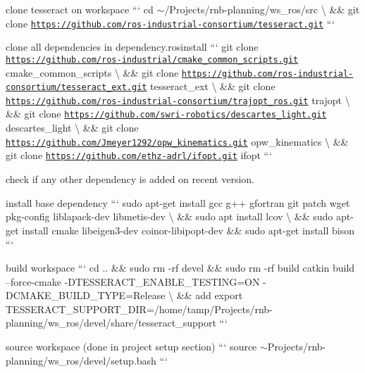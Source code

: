 \begin{DoxyItemize}
\item clone tesseract on workspace ``` cd $\sim$/\+Projects/rnb-\/planning/ws\+\_\+ros/src \textbackslash{} \&\& git clone \href{https://github.com/ros-industrial-consortium/tesseract.git}{\tt https\+://github.\+com/ros-\/industrial-\/consortium/tesseract.\+git} ```
\item clone all dependencies in dependency.\+rosinstall ``` git clone \href{https://github.com/ros-industrial/cmake_common_scripts.git}{\tt https\+://github.\+com/ros-\/industrial/cmake\+\_\+common\+\_\+scripts.\+git} cmake\+\_\+common\+\_\+scripts \textbackslash{} \&\& git clone \href{https://github.com/ros-industrial-consortium/tesseract_ext.git}{\tt https\+://github.\+com/ros-\/industrial-\/consortium/tesseract\+\_\+ext.\+git} tesseract\+\_\+ext \textbackslash{} \&\& git clone \href{https://github.com/ros-industrial-consortium/trajopt_ros.git}{\tt https\+://github.\+com/ros-\/industrial-\/consortium/trajopt\+\_\+ros.\+git} trajopt \textbackslash{} \&\& git clone \href{https://github.com/swri-robotics/descartes_light.git}{\tt https\+://github.\+com/swri-\/robotics/descartes\+\_\+light.\+git} descartes\+\_\+light \textbackslash{} \&\& git clone \href{https://github.com/Jmeyer1292/opw_kinematics.git}{\tt https\+://github.\+com/\+Jmeyer1292/opw\+\_\+kinematics.\+git} opw\+\_\+kinematics \textbackslash{} \&\& git clone \href{https://github.com/ethz-adrl/ifopt.git}{\tt https\+://github.\+com/ethz-\/adrl/ifopt.\+git} ifopt ```
\begin{DoxyItemize}
\item check if any other dependency is added on recent version.
\end{DoxyItemize}
\item install base dependency ``` sudo apt-\/get install gcc g++ gfortran git patch wget pkg-\/config liblapack-\/dev libmetis-\/dev \textbackslash{} \&\& sudo apt install lcov \textbackslash{} \&\& sudo apt-\/get install cmake libeigen3-\/dev coinor-\/libipopt-\/dev \&\& sudo apt-\/get install bison ```
\item build workspace ``` cd .. \&\& sudo rm -\/rf devel \&\& sudo rm -\/rf build catkin build --force-\/cmake -\/\+D\+T\+E\+S\+S\+E\+R\+A\+C\+T\+\_\+\+E\+N\+A\+B\+L\+E\+\_\+\+T\+E\+S\+T\+I\+NG=ON -\/\+D\+C\+M\+A\+K\+E\+\_\+\+B\+U\+I\+L\+D\+\_\+\+T\+Y\+PE=Release \textbackslash{} \&\& add export T\+E\+S\+S\+E\+R\+A\+C\+T\+\_\+\+S\+U\+P\+P\+O\+R\+T\+\_\+\+D\+IR=\textquotesingle{}/home/tamp/\+Projects/rnb-\/planning/ws\+\_\+ros/devel/share/tesseract\+\_\+support\textquotesingle{} ```
\item source workspace (done in project setup section) ``` source $\sim$\+Projects/rnb-\/planning/ws\+\_\+ros/devel/setup.bash ```
\end{DoxyItemize}

